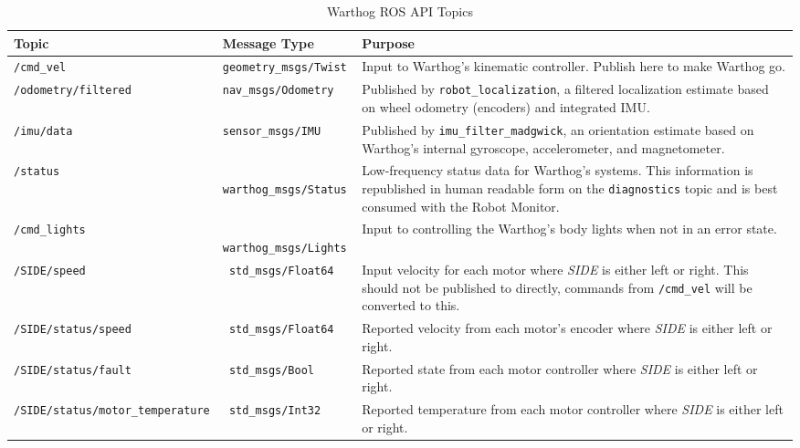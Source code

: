 \documentclass[]{clearpath-latex/clearpath-manual}
\begin{document}
\bgroup
\begin{table}[htp]
\begin{tabular}{  l  l  p{7cm} }
\hline
Topic & Message Type & Purpose \\ \hline

\lstinline!/cmd_vel! & \lstinline!geometry_msgs/Twist! &
Input to Warthog's kinematic controller. Publish here to make Warthog go. \\ \hline
\lstinline!/odometry/filtered! & \lstinline!nav_msgs/Odometry! &
Published by \lstinline!robot_localization!, a filtered localization estimate based
on wheel odometry (encoders) and  integrated IMU. \\ \hline

\lstinline!/imu/data! & \lstinline!sensor_msgs/IMU! &
Published by \lstinline!imu_filter_madgwick!, an orientation estimate based on Warthog's
internal gyroscope, accelerometer, and magnetometer. \\ \hline

\lstinline!/status! & \lstinline! warthog_msgs/Status! &
Low-frequency status data for Warthog's systems. This information is republished in human
readable form on the \lstinline!diagnostics! topic and is best consumed with the Robot
Monitor. \\ \hline

\lstinline!/cmd_lights! & \lstinline! warthog_msgs/Lights! &
Input to controlling the Warthog's body lights when not in an error state. \\ \hline


\lstinline!/SIDE/speed! & \lstinline! std_msgs/Float64! &
Input velocity for each motor where \textit{SIDE} is either left or right.  This should not be published to directly, commands from \lstinline!/cmd_vel! will be converted to this.\\ \hline

\lstinline!/SIDE/status/speed! & \lstinline! std_msgs/Float64! &
Reported velocity from each motor's encoder where \textit{SIDE} is either left or right. \\ \hline

\lstinline!/SIDE/status/fault! & \lstinline! std_msgs/Bool! &
Reported state from each motor controller where \textit{SIDE} is either left or right. \\ \hline

\lstinline!/SIDE/status/motor_temperature! & \lstinline! std_msgs/Int32! &
Reported temperature from each motor controller where \textit{SIDE} is either left or right. \\ \hline

\end{tabular}
\caption{Warthog ROS API Topics}
\label{tab:rosapi}
\end{table}
\egroup
\end{document}
